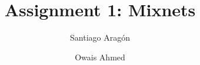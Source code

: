 \documentclass[preprint,12pt,3p]{elsarticle}
\begin{document}
\begin{frontmatter}

\title{Assignment 1: Mixnets}

\author{Santiago Aragón}
\address{s.e.aragonramirez@student.utwente.nl}

\author{Owais Ahmed}
\address{o.ahmed@student.utwente.nl}
\address{University of Twente}



\end{frontmatter}


\end{document}
